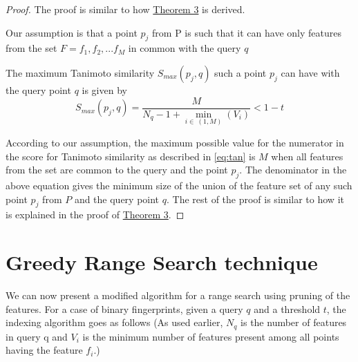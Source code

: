 \begin{proof}
\label{proof2}
The proof is similar to how \hyperref[thm1bound]{Theorem 3} is derived. 



Our assumption is that a point $p_j$ from P is such that it can have only features from the set $F=f_1, f_2,...f_M$ in common with the query $q$  
 
The maximum Tanimoto similarity $S_{max}(p_j,q)$ such a point $p_j$ can have with the query point $q$ is given by
\begin{equation}
\label{eq:max2}
S_{max}(p_j,q)=\frac{M}{N_q - 1 + \min\limits_{i\in~(1,M)}(V_i) } < 1-t 
\end{equation}

According to our assumption, the maximum possible value for the numerator in the score for Tanimoto similarity as described in \autoref{eq:tan} is $M$ when all features from the set are common to the query and the point $p_j$. The denominator in the above equation gives the minimum size of the union of the feature set of any such point $p_j$ from $P$ and the query point $q$. 
The rest of the proof is similar to how it is explained in the proof of \hyperref[thm1bound]{Theorem 3}.
\end{proof}


\section{Greedy Range Search technique}
\label{sec:prune1.1}
We can now present a modified algorithm for a range search using pruning of the features. For a case of binary fingerprints, given a query $q$ and a threshold  $t$, the indexing algorithm goes as follows (As used earlier, $N_q$ is the number of features in query q and $V_{i}$ is the minimum number of features present among all points having the feature $f_i$.)

